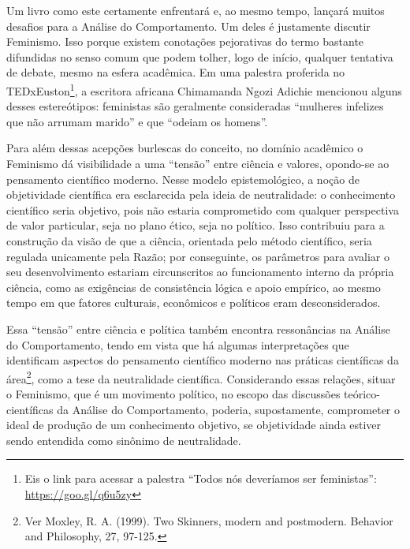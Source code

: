 Um livro como este certamente enfrentará e, ao mesmo tempo, lançará muitos desafios para a Análise do Comportamento. Um deles é justamente discutir Feminismo. Isso porque existem conotações pejorativas do termo bastante difundidas no senso comum que podem tolher, logo de início, qualquer tentativa de debate, mesmo na esfera acadêmica. Em uma palestra proferida no TEDxEuston\footnote{Eis o link para acessar a palestra “Todos nós deveríamos ser feministas”: \url{https://goo.gl/q6u5zy}}, a escritora africana Chimamanda Ngozi Adichie mencionou alguns desses estereótipos: feministas são geralmente consideradas “mulheres infelizes que não arrumam marido” e que “odeiam os homens”. 

Para além dessas acepções burlescas do conceito, no domínio acadêmico o Feminismo dá visibilidade a uma “tensão” entre ciência e valores, opondo-se ao pensamento científico moderno. Nesse modelo epistemológico, a noção de objetividade científica era esclarecida pela ideia de neutralidade: o conhecimento científico seria objetivo, pois não estaria comprometido com qualquer perspectiva de valor particular, seja no plano ético, seja no político. Isso contribuiu para a construção da visão de que a ciência, orientada pelo método científico, seria regulada unicamente pela Razão; por conseguinte, os parâmetros para avaliar o seu desenvolvimento estariam circunscritos ao funcionamento interno da própria ciência, como as exigências de consistência lógica e apoio empírico, ao mesmo tempo em que fatores culturais, econômicos e políticos eram desconsiderados. 

Essa “tensão” entre ciência e política também encontra ressonâncias na Análise do Comportamento, tendo em vista que há algumas interpretações que identificam aspectos do pensamento científico moderno nas práticas científicas da área\footnote{Ver Moxley, R. A. (1999). Two Skinners, modern and postmodern. Behavior and Philosophy, 27, 97-125.}, como a tese da neutralidade científica. Considerando essas relações, situar o Feminismo, que é um movimento político, no escopo das discussões teórico-científicas da Análise do Comportamento, poderia, supostamente, comprometer o ideal de produção de um conhecimento objetivo, se objetividade ainda estiver sendo entendida como sinônimo de neutralidade.

